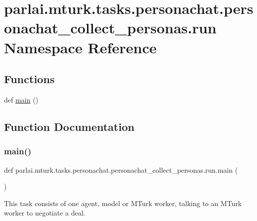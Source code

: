 \hypertarget{namespaceparlai_1_1mturk_1_1tasks_1_1personachat_1_1personachat__collect__personas_1_1run}{}\section{parlai.\+mturk.\+tasks.\+personachat.\+personachat\+\_\+collect\+\_\+personas.\+run Namespace Reference}
\label{namespaceparlai_1_1mturk_1_1tasks_1_1personachat_1_1personachat__collect__personas_1_1run}
\subsection*{Functions}
\begin{DoxyCompactItemize}
\item 
def \hyperlink{namespaceparlai_1_1mturk_1_1tasks_1_1personachat_1_1personachat__collect__personas_1_1run_a334f052cd3e8caffe3a2a4b7e4b668e2}{main} ()
\end{DoxyCompactItemize}


\subsection{Function Documentation}
\mbox{\label{namespaceparlai_1_1mturk_1_1tasks_1_1personachat_1_1personachat__collect__personas_1_1run_a334f052cd3e8caffe3a2a4b7e4b668e2}} 
\subsubsection{\texorpdfstring{main()}{main()}}
{\footnotesize\ttfamily def parlai.\+mturk.\+tasks.\+personachat.\+personachat\+\_\+collect\+\_\+personas.\+run.\+main (\begin{DoxyParamCaption}{ }\end{DoxyParamCaption})}

\begin{DoxyVerb}This task consists of one agent, model or MTurk worker, talking to an MTurk worker
to negotiate a deal.
\end{DoxyVerb}
 